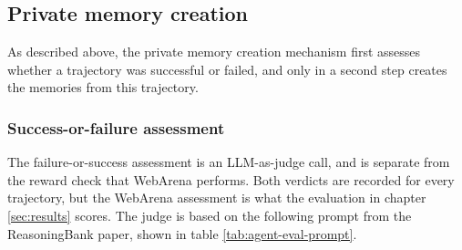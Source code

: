 \subsection{Private memory creation}\label{sec:private memory creation experiment}
As described above, the private memory creation mechanism first assesses whether a trajectory was successful or failed, and only in a second step creates the memories from this trajectory.

\subsubsection{Success-or-failure assessment}
The failure-or-success assessment is an LLM-as-judge call, and is separate from the reward check that WebArena performs. Both verdicts are recorded for every trajectory, but the WebArena assessment is what the evaluation in chapter \ref{sec:results} scores. The judge is based on the following prompt from the ReasoningBank paper, shown in table \ref{tab:agent-eval-prompt}.

